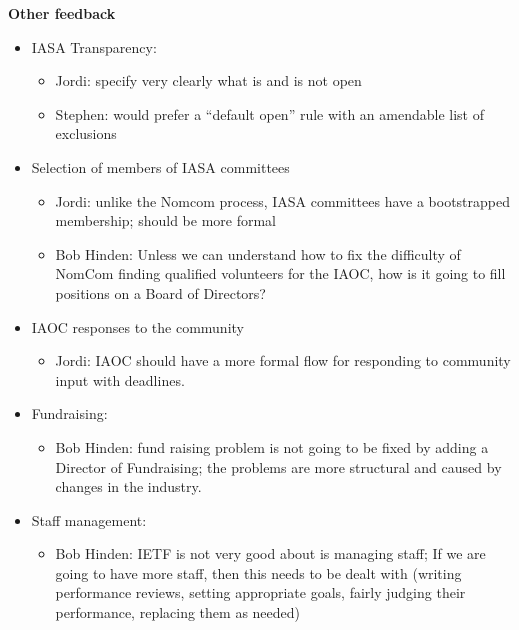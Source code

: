 \documentclass[helvetica]{seminar}
\newcommand{\heading}[1]{%
  \begin{center} 
    \large\bf 
    #1 
  \end{center} 
  \vspace{.4 in}}
\begin{document}
\begin{slide}

\heading{Other feedback}


\begin{itemize}
\item IASA Transparency:
  \begin{itemize}
  \item Jordi: specify very clearly what is and is not open
  \item Stephen: would prefer a “default open” rule with an amendable
    list of exclusions
  \end{itemize}
\item Selection of members of IASA committees
  \begin{itemize}
  \item Jordi: unlike the Nomcom process, IASA committees have a
    bootstrapped membership; should be more formal
  \item Bob Hinden: Unless we can understand how to fix the difficulty
    of NomCom finding qualified volunteers for the IAOC, how is it
    going to fill positions on a Board of Directors?
  \end{itemize}
\item IAOC responses to the community
  \begin{itemize}
  \item Jordi: IAOC should have a more formal flow for responding to
    community input with deadlines.
  \end{itemize}
\item Fundraising:
  \begin{itemize}
  \item Bob Hinden: fund raising problem is not going to be fixed by
    adding a Director of Fundraising; the problems are more structural
    and caused by changes in the industry.
  \end{itemize}
\item Staff management:
  \begin{itemize}
  \item Bob Hinden: IETF is not very good about is managing staff; If
    we are going to have more staff, then this needs to be dealt with
    (writing performance reviews, setting appropriate goals, fairly
    judging their performance, replacing them as needed)
  \end{itemize}
\end{itemize}

\end{slide}
\end{document}
